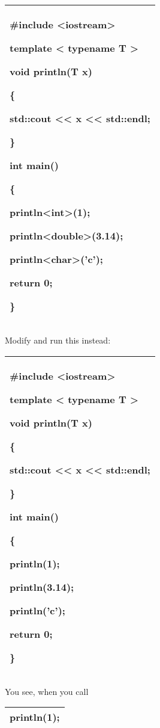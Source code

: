 \documentclass[
]{article}
\begin{document}
\begin{longtable}[]{@{}l@{}}
\toprule
\endhead
\begin{minipage}[t]{0.97\columnwidth}\raggedright
\#include \textless iostream\textgreater{}

template \textless{} typename T \textgreater{}

void println(T x)

\{

std::cout \textless\textless{} x \textless\textless{} std::endl;

\}

int main()

\{

println\textless int\textgreater(1);

println\textless double\textgreater(3.14);

println\textless char\textgreater('c');

return 0;

\}\strut
\end{minipage}\tabularnewline
\bottomrule
\end{longtable}

Modify and run this instead:

\begin{longtable}[]{@{}l@{}}
\toprule
\endhead
\begin{minipage}[t]{0.97\columnwidth}\raggedright
\#include \textless iostream\textgreater{}

template \textless{} typename T \textgreater{}

void println(T x)

\{

std::cout \textless\textless{} x \textless\textless{} std::endl;

\}

int main()

\{

println(1);

println(3.14);

println('c');

return 0;

\}\strut
\end{minipage}\tabularnewline
\bottomrule
\end{longtable}

You see, when you call

\begin{longtable}[]{@{}l@{}}
\toprule
\endhead
println(1);\tabularnewline
\bottomrule
\end{longtable}
\end{document}
